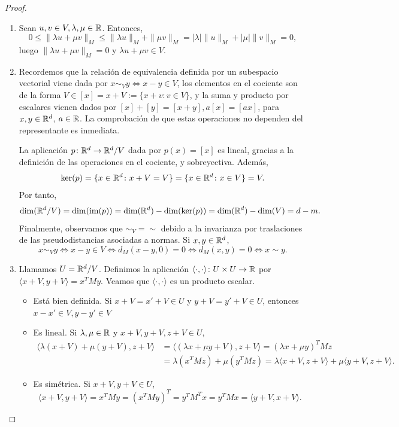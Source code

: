 \documentclass{book}
\begin{document}
\begin{proof}
	\begin{enumerate}
		\item Sean $u, v \in V, \lambda, \mu \in \mathbb{R}$. Entonces,
		\[0 \le \|\lambda u + \mu v \|_M \le \|\lambda u \|_M+\|\mu v\|_M = |\lambda|\|u\|_M+|\mu|\|v\|_M = 0, \]
		luego $\|\lambda u + \mu v\|_M = 0$ y $\lambda u + \mu v \in V$.

		\item Recordemos que la relación de equivalencia definida por un subespacio vectorial viene dada por $x \sim_V y \iff x - y \in V$, los elementos en el cociente son de la forma $V \in [x] = x+ V := \{x+v \colon v \in V\}$, y la suma y producto por escalares vienen dados por $[x] + [y] = [x+y], a[x] = [ax]$, para $x,y \in \mathbb{R}^d$, $a \in \mathbb{R}$. La comprobación de que estas operaciones no dependen del representante es inmediata. 

		La aplicación $p\colon \mathbb{R}^d \to \mathbb{R}^d/V$ dada por $p(x) = [x]$ es lineal, gracias a la definición de las operaciones en el cociente, y sobreyectiva. Además,
		\[\ker(p) = \{x \in \mathbb{R}^d \colon x + V = V \} = \{x \in \mathbb{R}^d \colon x \in V  \} = V. \]
		Por tanto,
		\[ \dim(\mathbb{R}^d/V) = \dim(\operatorname{im}(p)) = \dim(\mathbb{R}^d) - \dim(\ker(p)) = \dim(\mathbb{R}^d) - \dim(V) = d - m.\]
		Finalmente, observamos que $\sim_{V} = \sim$ debido a la invarianza por traslaciones de las pseudodistancias asociadas a normas. Si $x,y \in \mathbb{R}^d$,
		\[ x \sim_{V} y \iff x-y \in V \iff d_M(x-y,0) = 0 \iff d_M(x,y) = 0  \iff x \sim y.\]

		\item Llamamos $U = \mathbb{R}^d/V$. Definimos la aplicación $\langle \cdot, \cdot \rangle \colon U \times U \to \mathbb{R}$ por $\langle x +V, y+V \rangle = x^TMy$. Veamos que $\langle \cdot, \cdot \rangle$ es un producto escalar.
		\begin{itemize}
			\item Está bien definida. Si $x+V = x'+V \in U$ y $y+V=y'+V \in U$, entonces $x-x' \in V, y-y' \in V$

			\item Es lineal. Si $\lambda, \mu \in \mathbb{R}$ y $x+V,y+V,z+V \in U$,
			\begin{align*}
			 \langle \lambda(x+V) + \mu(y+V), z + V \rangle &= \langle (\lambda x + \mu y + V), z + V \rangle = (\lambda x + \mu y)^TMz \\
			 								& = \lambda(x^TMz)+\mu(y^TMz) = \lambda\langle x+V,z+V \rangle + \mu\langle y+V,z+V \rangle.
			\end{align*}
			\item Es simétrica. Si $x+V,y+V \in U$,
			\[ \langle x + V, y+V \rangle = x^TMy = (x^TMy)^T = y^TM^Tx = y^TMx = \langle y + V, x+V\rangle. \]


\end{itemize}
\end{enumerate}
\end{proof}
\end{document}

